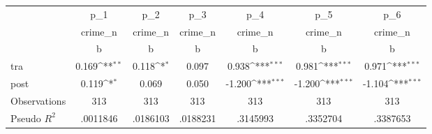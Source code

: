 {
\def\sym#1{\ifmmode^{#1}\else\(^{#1}\)\fi}
\begin{tabular}{l*{6}{c}}
\toprule
                    &         p\_1         &         p\_2         &         p\_3         &         p\_4         &         p\_5         &         p\_6         \\
                    &     crime\_n         &     crime\_n         &     crime\_n         &     crime\_n         &     crime\_n         &     crime\_n         \\
                    &           b         &           b         &           b         &           b         &           b         &           b         \\
\midrule
tra                 &       0.169\sym{**} &       0.118\sym{*}  &       0.097         &       0.938\sym{***}&       0.981\sym{***}&       0.971\sym{***}\\
post                &       0.119\sym{*}  &       0.069         &       0.050         &      -1.200\sym{***}&      -1.200\sym{***}&      -1.104\sym{***}\\
\midrule
Observations        &         313         &         313         &         313         &         313         &         313         &         313         \\
Pseudo \(R^{2}\)    &    .0011846         &    .0186103         &    .0188231         &    .3145993         &    .3352704         &    .3387653         \\
\bottomrule
\end{tabular}
}
